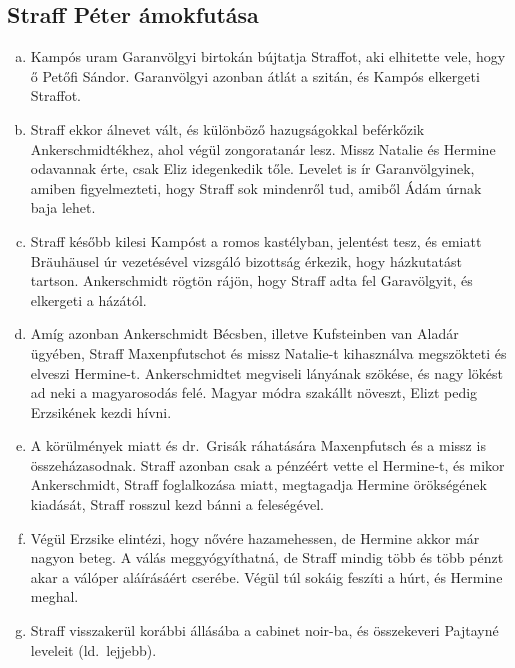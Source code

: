\documentclass{thesis-ekf}
\begin{document}
    \subsection{Straff Péter ámokfutása}

    \begin{enumerate}[a)]
        \item\label{itm:Petofi} Kampós uram Garanvölgyi birtokán bújtatja Straffot, aki elhitette vele, hogy ő Petőfi Sándor.
        Garanvölgyi azonban átlát a szitán, és Kampós elkergeti Straffot.
        \item\label{itm:Bogumil} Straff ekkor álnevet vált, és különböző hazugságokkal beférkőzik Ankerschmidtékhez, ahol végül zongoratanár lesz.
        Missz Natalie és Hermine odavannak érte, csak Eliz idegenkedik tőle.
        Levelet is ír Garanvölgyinek, amiben figyelmezteti, hogy Straff sok mindenről tud, amiből Ádám úrnak baja lehet.
        \item\label{itm:hazkutatas} Straff később kilesi Kampóst a romos kastélyban, jelentést tesz, és emiatt Bräuhäusel úr vezetésével
            vizsgáló bizottság érkezik, hogy házkutatást tartson.
        Ankerschmidt rögtön rájön, hogy Straff adta fel Garavölgyit, és elkergeti a házától.
        \item\label{itm:Hermine-szokese} Amíg azonban Ankerschmidt Bécsben, illetve Kufsteinben van Aladár ügyében,
            Straff Maxenpfutschot és missz Natalie-t kihasználva megszökteti és elveszi Hermine-t.
        Ankerschmidtet megviseli lányának szökése, és nagy lökést ad neki a magyarosodás felé.
        Magyar módra szakállt növeszt, Elizt pedig Erzsikének kezdi hívni.
        \item\label{itm:nincs-hozomany} A körülmények miatt és dr.~Grisák ráhatására Maxenpfutsch és a missz is összeházasodnak.
        Straff azonban csak a pénzéért vette el Hermine-t, és mikor Ankerschmidt, Straff foglalkozása miatt,
            megtagadja Hermine örökségének kiadását, Straff rosszul kezd bánni a feleségével.
        \item\label{itm:Archimedeszi-csavar} Végül Erzsike elintézi, hogy nővére hazamehessen, de Hermine akkor már nagyon beteg.
        A válás meggyógyíthatná, de Straff mindig több és több pénzt akar a válóper aláírásáért cserébe.
        Végül túl sokáig feszíti a húrt, és Hermine meghal.
        \item\label{itm:cabinet-noir} Straff visszakerül korábbi állásába a cabinet noir-ba, és összekeveri Pajtayné leveleit (ld.~lejjebb).
    \end{enumerate}
\end{document}
